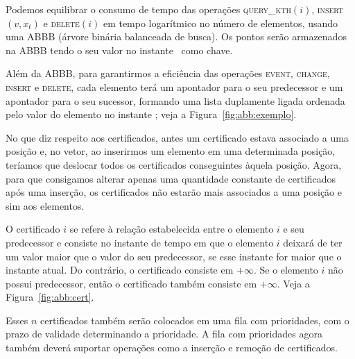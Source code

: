 Podemos equilibrar o consumo de tempo das operações
\textsc{query\_kth}$(i)$, \textsc{insert}$(v, x_t)$ e
\textsc{delete}$(i)$ em tempo logarítmico no número de elementos,
usando uma ABBB (árvore binária balanceada de busca).
Os pontos serão armazenados na ABBB tendo o seu valor no instante \now~como
chave.

Além da ABBB, para garantirmos a eficiência das operações
\textsc{event}, \textsc{change}, \textsc{insert} e \textsc{delete},
cada elemento terá um apontador para o seu predecessor e um
apontador para o seu sucessor, formando uma lista duplamente ligada
ordenada pelo valor do elemento no instante \now; veja a Figura~\ref{fig:abb:exemplo}.



No que diz respeito aos certificados, antes um certificado estava
associado a uma posição e, no vetor, ao inserirmos um elemento em
uma determinada posição, teríamos que deslocar %
todos os certificados conseguintes àquela posição.
Agora, para que consigamos alterar apenas uma quantidade constante de certificados
após uma inserção, os certificados não estarão mais associados a uma
posição e sim aos elementos.

O certificado $i$ se refere à relação estabelecida entre o elemento
$i$ e seu predecessor e consiste no instante de tempo em que o
elemento $i$ deixará de ter um valor maior que o valor do seu
predecessor, se esse instante for maior que o instante atual.
Do contrário, o certificado consiste em $+\infty$.
Se o elemento $i$ não possui predecessor, então o certificado também consiste em
$+\infty$.
Veja a Figura~\ref{fig:abb:cert}.

Esses $n$ certificados também serão colocados em uma fila com
prioridades, com o prazo de validade determinando a prioridade.
A fila com prioridades agora também deverá suportar operações
como a inserção e remoção de certificados.



